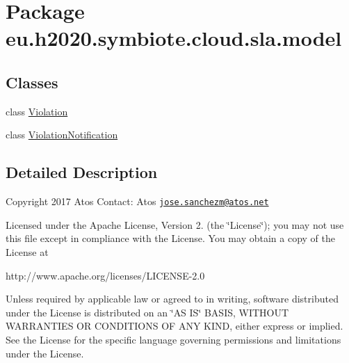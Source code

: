 \hypertarget{namespaceeu_1_1h2020_1_1symbiote_1_1cloud_1_1sla_1_1model}{}\section{Package eu.\+h2020.\+symbiote.\+cloud.\+sla.\+model}
\label{namespaceeu_1_1h2020_1_1symbiote_1_1cloud_1_1sla_1_1model}
\subsection*{Classes}
\begin{DoxyCompactItemize}
\item 
class \hyperlink{classeu_1_1h2020_1_1symbiote_1_1cloud_1_1sla_1_1model_1_1Violation}{Violation}
\item 
class \hyperlink{classeu_1_1h2020_1_1symbiote_1_1cloud_1_1sla_1_1model_1_1ViolationNotification}{Violation\+Notification}
\end{DoxyCompactItemize}


\subsection{Detailed Description}
Copyright 2017 Atos Contact\+: Atos \href{mailto:jose.sanchezm@atos.net}{\tt jose.\+sanchezm@atos.\+net}

Licensed under the Apache License, Version 2. (the \char`\"{}\+License\char`\"{}); you may not use this file except in compliance with the License. You may obtain a copy of the License at \begin{DoxyVerb}http://www.apache.org/licenses/LICENSE-2.0
\end{DoxyVerb}


Unless required by applicable law or agreed to in writing, software distributed under the License is distributed on an \char`\"{}\+A\+S I\+S\char`\"{} B\+A\+S\+IS, W\+I\+T\+H\+O\+UT W\+A\+R\+R\+A\+N\+T\+I\+ES OR C\+O\+N\+D\+I\+T\+I\+O\+NS OF A\+NY K\+I\+ND, either express or implied. See the License for the specific language governing permissions and limitations under the License. 